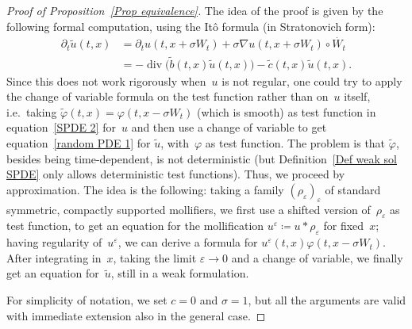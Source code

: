 \documentclass[a4paper,10pt]{article}
\newcommand\1{\mathbbm{1}}
\newcommand{\td}{\tilde}
\newcommand{\eps}{\varepsilon}
\DeclareMathOperator{\diverg}{div}
\numberwithin{equation}{section}
\begin{document}
\begin{proof}[Proof of Proposition~\ref{Prop equivalence}]
The idea of the proof is given by the following formal computation, using the It\^o formula (in Stratonovich form):
\begin{align}
\partial_t\td{u}(t,x)& =\partial_t u(t,x+\sigma W_t)+ \sigma \nabla u(t,x+\sigma W_t)\circ\dot{W_t} \nonumber  \\
 & =-\diverg \big(\td{b}(t,x) \td{u}(t,x)\big)-\td{c}(t,x)\td{u}(t,x) .\label{formalequiv}
\end{align}
Since this does not work rigorously when~$u$ is not regular, one could try to apply the change of variable formula on the test function rather than on~$u$ itself, i.e.~taking $\td{\varphi}(t,x)=\varphi(t,x-\sigma W_t)$ (which is smooth) as test function in equation~\eqref{SPDE 2} for~$u$ and then use a change of variable to get equation~\eqref{random PDE 1} for $\td{u}$, with~$\varphi$ as test function. The problem is that $\td{\varphi}$, besides being time-dependent, is not deterministic (but Definition~\ref{Def weak sol SPDE} only allows deterministic test functions). Thus, we proceed by approximation. The idea is the following: taking a family $(\rho_\eps)_\eps$ of standard symmetric, compactly supported mollifiers, we first use a shifted version of~$\rho_\eps$ as test function, to get an equation for the mollification $u^\eps \coloneqq u*\rho_\eps$ for fixed~$x$; having regularity of~$u^\eps$, we can derive a formula for $u^\eps(t,x) \varphi(t,x- \sigma W_t)$. After integrating in~$x$, taking the limit $\varepsilon \to 0$ and a change of variable, we finally get an equation for~$\td{u}$, still in a weak formulation. 

For simplicity of notation, we set $c=0$ and $\sigma =1$, but all the arguments are valid with immediate extension also in the general case.


\end{proof}
\end{document}
